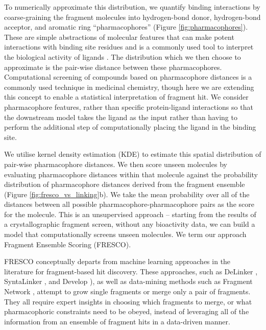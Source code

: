 To numerically approximate this distribution, we quantify binding interactions by coarse-graining the fragment molecules into hydrogen-bond donor, hydrogen-bond acceptor, and aromatic ring ``pharmacophores'' (Figure \ref{fig:pharmacophores}). These are simple abstractions of molecular features that can make potent interactions with binding site residues and is a commonly used tool to interpret the biological activity of ligands \cite{Kaserer2015PharmacophoreReview}. The distribution which we then choose to approximate is the pair-wise distance between these pharmacophores. Computational screening of compounds based on pharmacophore distances is a commonly used technique in medicinal chemistry, though here we are extending this concept to enable a statistical interpretation of fragment hit. We consider pharmacophore features, rather than specific protein-ligand interactions so that the downstream model takes the ligand as the input rather than having to perform the additional step of computationally placing the ligand in the binding site. 


We utilise kernel density estimation (KDE) \cite{Parzen1962KDE} to estimate this spatial distribution of pair-wise pharmacophore distances. We then score unseen molecules by evaluating pharmacophore distances within that molecule against the probability distribution of pharmacophore distances derived from the fragment ensemble (Figure \ref{fig:fresco_vs_linking}b). We take the mean probability over all of the distances between all possible pharmacophore-pharmacophore pairs as the score for the molecule. This is an unsupervised approach -- starting from the results of a crystallographic fragment screen, without any bioactivity data, we can build a model that computationally screens unseen molecules. We term our approach Fragment Ensemble Scoring (FRESCO). 

FRESCO conceptually departs from machine learning approaches in the literature for fragment-based hit discovery. These approaches, such as DeLinker \cite{Imrie2020DeLinker}, SyntaLinker \cite{Yang2020SyntaLinker}, and Develop \cite{Imrie2021Develop}), as well as data-mining methods such as Fragment Network \cite{Hall2017FragNet}, attempt to grow single fragments or merge only a pair of fragments. They all require expert insights in choosing which fragments to merge, or what pharmacophoric constraints need to be obeyed, instead of leveraging all of the information from an ensemble of fragment hits in a data-driven manner.

